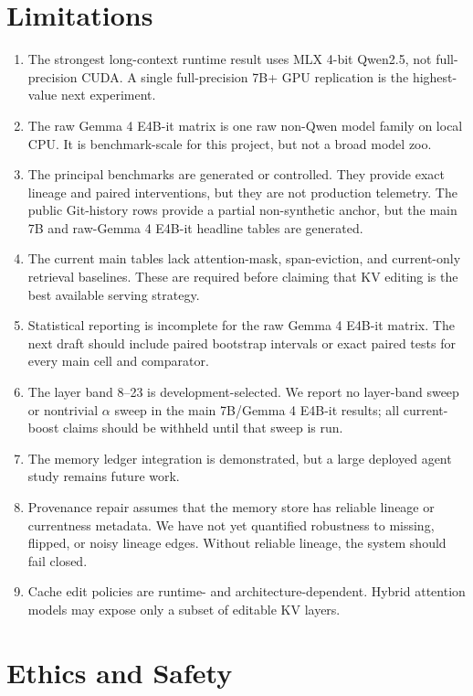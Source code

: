 \documentclass[11pt]{article}
\newcommand{\gemma}{Gemma 4 E4B-it}
\begin{document}
\section{Limitations}
\label{sec:limitations}

\begin{enumerate}[leftmargin=1.5em]
  \item The strongest long-context runtime result uses MLX 4-bit Qwen2.5, not
  full-precision CUDA. A single full-precision 7B+ GPU replication is the
  highest-value next experiment.
  \item The raw \gemma{} matrix is one raw non-Qwen model family on local CPU.
  It is benchmark-scale for this project, but not a broad model zoo.
  \item The principal benchmarks are generated or controlled. They provide
  exact lineage and paired interventions, but they are not production telemetry.
  The public Git-history rows provide a partial non-synthetic anchor, but the
  main 7B and raw-\gemma{} headline tables are generated.
  \item The current main tables lack attention-mask, span-eviction, and
  current-only retrieval baselines. These are required before claiming that KV
  editing is the best available serving strategy.
  \item Statistical reporting is incomplete for the raw \gemma{} matrix. The
  next draft should include paired bootstrap intervals or exact paired tests
  for every main cell and comparator.
  \item The layer band 8--23 is development-selected. We report no layer-band
  sweep or nontrivial $\alpha$ sweep in the main 7B/\gemma{} results; all
  current-boost claims should be withheld until that sweep is run.
  \item The memory ledger integration is demonstrated, but a large deployed
  agent study remains future work.
  \item Provenance repair assumes that the memory store has reliable lineage or
  currentness metadata. We have not yet quantified robustness to missing,
  flipped, or noisy lineage edges. Without reliable lineage, the system should
  fail closed.
  \item Cache edit policies are runtime- and architecture-dependent. Hybrid
  attention models may expose only a subset of editable KV layers.
\end{enumerate}

\section{Ethics and Safety}
\end{document}
